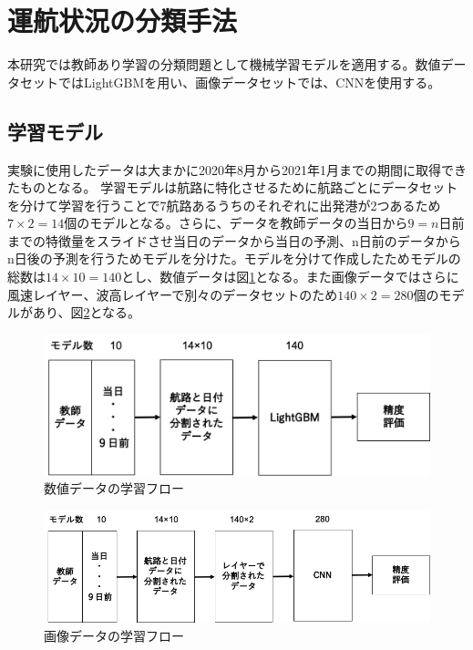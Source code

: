 \section{運航状況の分類手法}
本研究では教師あり学習の分類問題として機械学習モデルを適用する。数値データセットではLightGBMを用い、画像データセットでは、CNNを使用する。
\subsection{学習モデル}
実験に使用したデータは大まかに2020年8月から2021年1月までの期間に取得できたものとなる。
学習モデルは航路に特化させるために航路ごとにデータセットを分けて学習を行うことで7航路あるうちのそれぞれに出発港が2つあるため$7\times2=14$個のモデルとなる。さらに、データを教師データの当日から$9=n$日前までの特徴量をスライドさせ当日のデータから当日の予測、n日前のデータからn日後の予測を行うためモデルを分けた。モデルを分けて作成したためモデルの総数は$14\times10=140$とし、数値データは図\ref{value_flow}となる。また画像データではさらに風速レイヤー、波高レイヤーで別々のデータセットのため$140\times2=280$個のモデルがあり、図\ref{img_flow}となる。

\begin{figure}[H]
 \centering
 \includegraphics[keepaspectratio, scale=0.5]{fig/chapter3/value_flow.png}
 \caption{数値データの学習フロー}
 \label{value_flow}
\end{figure}

\begin{figure}[H]
 \centering
 \includegraphics[keepaspectratio, scale=0.5]{fig/chapter3/img_flow.png}
 \caption{画像データの学習フロー}
 \label{img_flow}
\end{figure}





